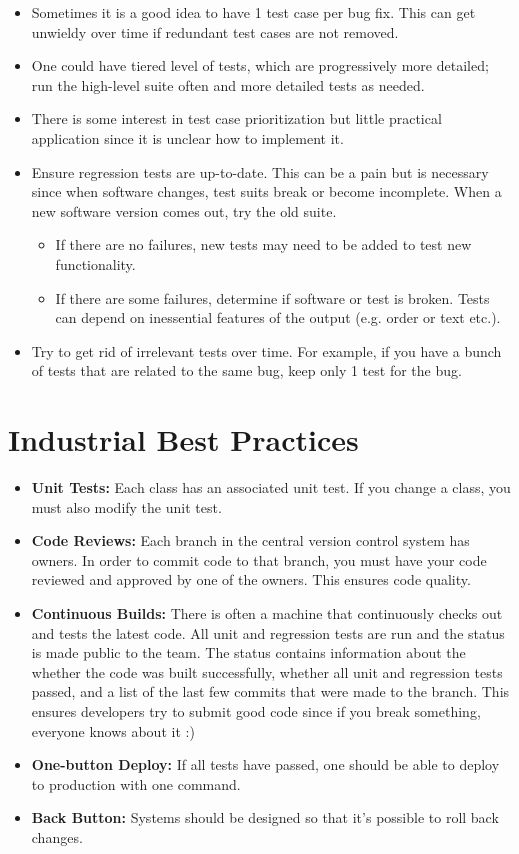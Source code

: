 \documentclass[11pt]{article}
\begin{document}
\begin{itemize}[noitemsep]
\item Sometimes it is a good idea to have 1 test case per bug fix. This can get unwieldy over time if redundant test cases are not removed.
\item One could have tiered level of tests, which are progressively more detailed; run the high-level suite often and more detailed tests as needed.
\item There is some interest in test case prioritization but little practical application since it is unclear how to implement it.
\item Ensure regression tests are up-to-date. This can be a pain but is necessary since when software changes, test suits break or become incomplete. When a new software version comes out, try the old suite. 

\begin{itemize}[noitemsep]
\item If there are no failures, new tests may need to be added to test new functionality.
\item If there are some failures, determine if software or test is broken. Tests can depend on inessential features of the output (e.g. order or text etc.).
\end{itemize}

\item Try to get rid of irrelevant tests over time. For example, if you have a bunch of tests that are related to the same bug, keep only 1 test for the bug. 
\end{itemize}

\section*{Industrial Best Practices}

\begin{itemize}[noitemsep]

\item \textbf{Unit Tests:} Each class has an associated unit test. If you change a class, you must also modify the unit test.
\item \textbf{Code Reviews:} Each branch in the central version control system has owners. In order to commit code to that branch, you must have your code reviewed and approved by one of the owners. This ensures code quality.
\item \textbf{Continuous Builds:} There is often a machine that continuously checks out and tests the latest code. All unit and regression tests are run and the status is made public to the team. The status contains information about the whether the code was built successfully, whether all unit and regression tests passed, and a list of the last few commits that were made to the branch. This ensures developers try to submit good code since if you break something, everyone knows about it :)
\item \textbf{One-button Deploy:} If all tests have passed, one should be able to deploy to production
with one command.
\item \textbf{Back Button:} Systems should be designed so that it's possible to roll back changes.
\end{itemize}
\end{document}
